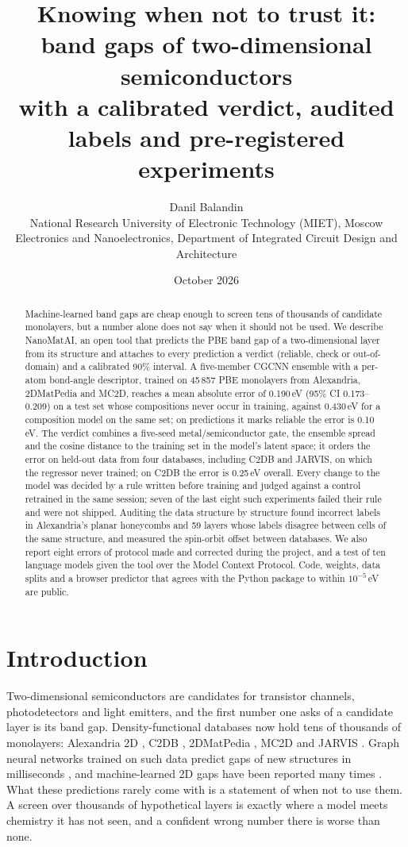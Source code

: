 \documentclass[11pt]{article}
\title{Knowing when not to trust it: band gaps of two-dimensional semiconductors\\
with a calibrated verdict, audited labels and pre-registered experiments}
\author{Danil Balandin\\[2pt]
\small National Research University of Electronic Technology (MIET), Moscow\\
\small Electronics and Nanoelectronics, Department of Integrated Circuit Design and Architecture}
\date{October 2026}
\begin{document}
\maketitle

\begin{abstract}
Machine-learned band gaps are cheap enough to screen tens of thousands of candidate
monolayers, but a number alone does not say when it should not be used. We describe
NanoMatAI, an open tool that predicts the PBE band gap of a two-dimensional layer from
its structure and attaches to every prediction a verdict (reliable, check or
out-of-domain) and a calibrated 90\% interval. A five-member CGCNN ensemble with a
per-atom bond-angle descriptor, trained on 45\,857 PBE monolayers from Alexandria,
2DMatPedia and MC2D, reaches a mean absolute error of 0.190\,eV (95\% CI 0.173--0.209)
on a test set whose compositions never occur in training, against 0.430\,eV for a
composition model on the same set; on predictions it marks reliable the error is
0.10\,eV. The verdict combines a five-seed metal/semiconductor gate, the ensemble
spread and the cosine distance to the training set in the model's latent space; it
orders the error on held-out data from four databases, including C2DB and JARVIS, on
which the regressor never trained; on C2DB the error is 0.25\,eV overall. Every change
to the model was decided by a rule written before training and judged against a
control retrained in the same session; seven of the last eight such experiments failed
their rule and were not shipped. Auditing the data
structure by structure found incorrect labels in Alexandria's planar honeycombs and
59 layers whose labels disagree between cells of the same structure, and measured the
spin-orbit offset between databases. We also report eight errors of protocol made and
corrected during the project, and a test of ten language models given the tool over
the Model Context Protocol. Code, weights, data splits and a browser predictor that
agrees with the Python package to within $10^{-5}$\,eV are public.
\end{abstract}

\section{Introduction}

Two-dimensional semiconductors are candidates for transistor channels, photodetectors
and light emitters, and the first number one asks of a candidate layer is its band gap.
Density-functional databases now hold tens of thousands of monolayers: Alexandria 2D
\citep{alexandria2d}, C2DB \citep{c2db2018,c2db2021}, 2DMatPedia \citep{2dmatpedia},
MC2D \citep{mc2d2018,mc2d2023} and JARVIS \citep{jarvis}. Graph neural networks trained on
such data predict gaps of new structures in milliseconds \citep{cgcnn,alignn}, and
machine-learned 2D gaps have been reported many times \citep{review2d}. What these
predictions rarely
come with is a statement of when not to use them. A screen over thousands of
hypothetical layers is exactly where a model meets chemistry it has not seen, and a
confident wrong number there is worse than none.
\end{document}
